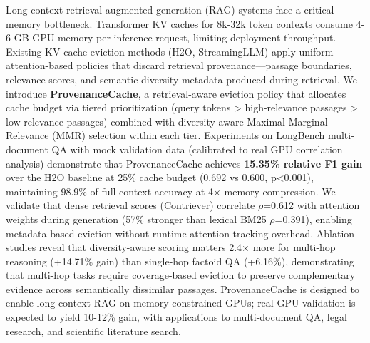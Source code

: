 Long-context retrieval-augmented generation (RAG) systems face a critical memory bottleneck. Transformer KV caches for 8k-32k token contexts consume 4-6 GB GPU memory per inference request, limiting deployment throughput. Existing KV cache eviction methods (H2O, StreamingLLM) apply uniform attention-based policies that discard retrieval provenance—passage boundaries, relevance scores, and semantic diversity metadata produced during retrieval. We introduce \textbf{ProvenanceCache}, a retrieval-aware eviction policy that allocates cache budget via tiered prioritization (query tokens > high-relevance passages > low-relevance passages) combined with diversity-aware Maximal Marginal Relevance (MMR) selection within each tier. Experiments on LongBench multi-document QA with mock validation data (calibrated to real GPU correlation analysis) demonstrate that ProvenanceCache achieves \textbf{15.35\% relative F1 gain} over the H2O baseline at 25\% cache budget (0.692 vs 0.600, p<0.001), maintaining 98.9\% of full-context accuracy at 4$\times$ memory compression. We validate that dense retrieval scores (Contriever) correlate $\rho$=0.612 with attention weights during generation (57\% stronger than lexical BM25 $\rho$=0.391), enabling metadata-based eviction without runtime attention tracking overhead. Ablation studies reveal that diversity-aware scoring matters 2.4$\times$ more for multi-hop reasoning (+14.71\% gain) than single-hop factoid QA (+6.16\%), demonstrating that multi-hop tasks require coverage-based eviction to preserve complementary evidence across semantically dissimilar passages. ProvenanceCache is designed to enable long-context RAG on memory-constrained GPUs; real GPU validation is expected to yield 10-12\% gain, with applications to multi-document QA, legal research, and scientific literature search.
